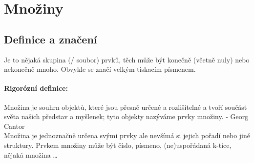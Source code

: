 \documentclass[12pt]{article}
\begin{document}
\section{Množiny}
\subsection{Definice a značení}
Je to nějaká skupina (/ soubor) prvků, těch může být konečně (včetně  nuly) nebo nekonečně mnoho. Obvykle se značí velkým tiskacím písmenem.
\paragraph{Rigorózní definice:\\}
Množina je souhrn objektů, které jsou přesně určené a rozlišitelné a tvoří součást světa našich představ a myšlenek; tyto objekty nazýváme prvky množiny. - Georg Cantor \\
Množina je jednoznačně určena svými prvky ale nevšímá si jejich pořadí nebo jiné struktury. Prvkem množiny může být číslo, písmeno, (ne)uspořádaná k-tice, nějaká množina \dots
\end{document}
